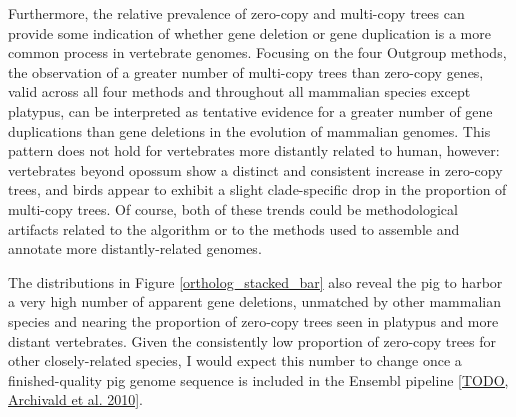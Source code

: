 Furthermore, the relative prevalence of zero-copy and multi-copy trees
can provide some indication of whether gene deletion or gene
duplication is a more common process in vertebrate genomes. Focusing
on the four Outgroup \subtr methods, the observation of a greater
number of multi-copy trees than zero-copy genes, valid across all four
\subtr methods and throughout all mammalian species except platypus,
can be interpreted as tentative evidence for a greater number of gene
duplications than gene deletions in the evolution of mammalian
genomes. This pattern does not hold for vertebrates more distantly
related to human, however: vertebrates beyond opossum show a distinct
and consistent increase in zero-copy trees, and birds appear to
exhibit a slight clade-specific drop in the proportion of multi-copy
trees. Of course, both of these trends could be methodological
artifacts related to the \hclust algorithm or to the methods used to
assemble and annotate more distantly-related genomes.

The distributions in Figure \ref{ortholog_stacked_bar} also reveal the
pig to harbor a very high number of apparent gene deletions, unmatched
by other mammalian species and nearing the proportion of zero-copy
trees seen in platypus and more distant vertebrates. Given the
consistently low proportion of zero-copy trees for other
closely-related species, I would expect this number to change once a
finished-quality pig genome sequence is included in the Ensembl
pipeline \ref{TODO, Archivald et al. 2010}.

